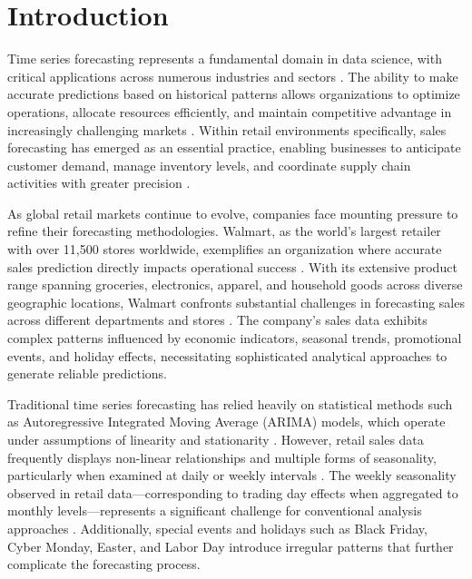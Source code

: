 %
%
%


\chapter{Introduction}


Time series forecasting represents a fundamental domain in data science, with critical applications across numerous industries and sectors \cite{Fildes:2019}. The ability to make accurate predictions based on historical patterns allows organizations to optimize operations, allocate resources efficiently, and maintain competitive advantage in increasingly challenging markets \cite{Pao:2017}. Within retail environments specifically, sales forecasting has emerged as an essential practice, enabling businesses to anticipate customer demand, manage inventory levels, and coordinate supply chain activities with greater precision \cite{Zhang:2021}.

As global retail markets continue to evolve, companies face mounting pressure to refine their forecasting methodologies. Walmart, as the world's largest retailer with over 11,500 stores worldwide, exemplifies an organization where accurate sales prediction directly impacts operational success \cite{Zhang:2021}. With its extensive product range spanning groceries, electronics, apparel, and household goods across diverse geographic locations, Walmart confronts substantial challenges in forecasting sales across different departments and stores \cite{Loyal:2017}. The company's sales data exhibits complex patterns influenced by economic indicators, seasonal trends, promotional events, and holiday effects, necessitating sophisticated analytical approaches to generate reliable predictions.

Traditional time series forecasting has relied heavily on statistical methods such as Autoregressive Integrated Moving Average (ARIMA) models, which operate under assumptions of linearity and stationarity \cite{Pao:2017}. However, retail sales data frequently displays non-linear relationships and multiple forms of seasonality, particularly when examined at daily or weekly intervals \cite{McElroy:2018}. The weekly seasonality observed in retail data—corresponding to trading day effects when aggregated to monthly levels—represents a significant challenge for conventional analysis approaches \cite{McElroy:2018}. Additionally, special events and holidays such as Black Friday, Cyber Monday, Easter, and Labor Day introduce irregular patterns that further complicate the forecasting process.

